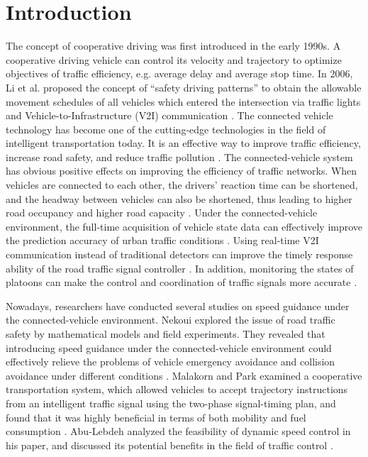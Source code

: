 \documentclass[10.5pt,compsoc]{TsT}
\theoremstyle{mystyle}
\newcommand{\upcite}[1]{\textsuperscript{\cite{#1}}}
\begin{document}
{\section{Introduction}
\label{s:introduction}
\noindent
The concept of cooperative driving was first introduced in the early
1990s. A cooperative driving vehicle can control its velocity and
trajectory to optimize objectives of traffic efficiency, e.g. average
delay and average stop time. In 2006, Li et al. proposed the concept of
``safety driving patterns'' to obtain the allowable movement schedules
of all vehicles which entered the intersection via traffic lights and
Vehicle-to-Infrastructure (V2I) communication \upcite{1}
\upcite{2}. The connected vehicle technology has become one of the
cutting-edge technologies in the field of intelligent transportation
today. It is an effective way to improve traffic efficiency, increase
road safety, and reduce traffic pollution \upcite{3}. The
connected-vehicle system has obvious positive effects on improving the
efficiency of traffic networks. When vehicles are connected to each
other, the drivers' reaction time can be shortened, and the headway
between vehicles can also be shortened, thus leading to higher road
occupancy and higher road capacity \upcite{4}. Under the
connected-vehicle environment, the full-time acquisition of vehicle
state data can effectively improve the prediction accuracy of urban
traffic conditions \upcite{5}. Using real-time V2I
communication instead of traditional detectors can improve the timely
response ability of the road traffic signal controller
\upcite{6}. In addition, monitoring the states of
platoons can make the control and coordination of traffic signals more
accurate \upcite{6}.

Nowadays, researchers have conducted several studies on speed guidance
under the connected-vehicle environment. Nekoui explored the issue of
road traffic safety by mathematical models and field experiments. They
revealed that introducing speed guidance under the connected-vehicle
environment could effectively relieve the problems of vehicle emergency
avoidance and collision avoidance under different conditions
\upcite{7}. Malakorn and Park examined a cooperative
transportation system, which allowed vehicles to accept trajectory
instructions from an intelligent traffic signal using the two-phase
signal-timing plan, and found that it was highly beneficial in terms of
both mobility and fuel consumption \upcite{8}. Abu-Lebdeh
analyzed the feasibility of dynamic speed control in his paper, and
discussed its potential benefits in the field of traffic control
\upcite{9}.

}
\end{document}
